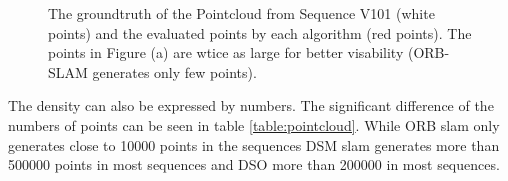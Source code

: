  

	\begin{figure}%
    \centering
    \qquad
	\qquad
    \caption{The groundtruth of the Pointcloud from Sequence V101 (white points) and the evaluated points by each algorithm (red points). 
	The points in Figure (a) are wtice as large for better visability (ORB-SLAM generates only few points). 
	}%
    \label{fig:pointcloud}%
	\end{figure}
	
	
	The density can also be expressed by numbers. The significant difference of the numbers of points can be seen in table \ref{table:pointcloud}. While 
	ORB slam only generates close to 10000 points in the sequences DSM slam generates more than 500000 points in most sequences and DSO more than 200000 
	in most sequences. 
	
